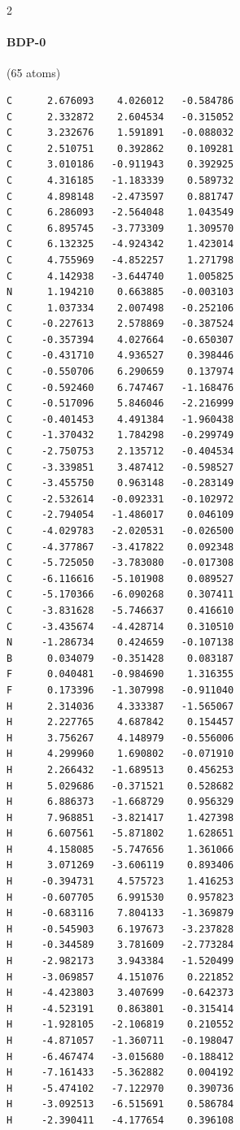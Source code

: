 \begin{multicols}{2}
\paragraph{BDP-0} (65 atoms)
{\scriptsize\linespread{1}\selectfont\begin{verbatim}
C      2.676093    4.026012   -0.584786
C      2.332872    2.604534   -0.315052
C      3.232676    1.591891   -0.088032
C      2.510751    0.392862    0.109281
C      3.010186   -0.911943    0.392925
C      4.316185   -1.183339    0.589732
C      4.898148   -2.473597    0.881747
C      6.286093   -2.564048    1.043549
C      6.895745   -3.773309    1.309570
C      6.132325   -4.924342    1.423014
C      4.755969   -4.852257    1.271798
C      4.142938   -3.644740    1.005825
N      1.194210    0.663885   -0.003103
C      1.037334    2.007498   -0.252106
C     -0.227613    2.578869   -0.387524
C     -0.357394    4.027664   -0.650307
C     -0.431710    4.936527    0.398446
C     -0.550706    6.290659    0.137974
C     -0.592460    6.747467   -1.168476
C     -0.517096    5.846046   -2.216999
C     -0.401453    4.491384   -1.960438
C     -1.370432    1.784298   -0.299749
C     -2.750753    2.135712   -0.404534
C     -3.339851    3.487412   -0.598527
C     -3.455750    0.963148   -0.283149
C     -2.532614   -0.092331   -0.102972
C     -2.794054   -1.486017    0.046109
C     -4.029783   -2.020531   -0.026500
C     -4.377867   -3.417822    0.092348
C     -5.725050   -3.783080   -0.017308
C     -6.116616   -5.101908    0.089527
C     -5.170366   -6.090268    0.307411
C     -3.831628   -5.746637    0.416610
C     -3.435674   -4.428714    0.310510
N     -1.286734    0.424659   -0.107138
B      0.034079   -0.351428    0.083187
F      0.040481   -0.984690    1.316355
F      0.173396   -1.307998   -0.911040
H      2.314036    4.333387   -1.565067
H      2.227765    4.687842    0.154457
H      3.756267    4.148979   -0.556006
H      4.299960    1.690802   -0.071910
H      2.266432   -1.689513    0.456253
H      5.029686   -0.371521    0.528682
H      6.886373   -1.668729    0.956329
H      7.968851   -3.821417    1.427398
H      6.607561   -5.871802    1.628651
H      4.158085   -5.747656    1.361066
H      3.071269   -3.606119    0.893406
H     -0.394731    4.575723    1.416253
H     -0.607705    6.991530    0.957823
H     -0.683116    7.804133   -1.369879
H     -0.545903    6.197673   -3.237828
H     -0.344589    3.781609   -2.773284
H     -2.982173    3.943384   -1.520499
H     -3.069857    4.151076    0.221852
H     -4.423803    3.407699   -0.642373
H     -4.523191    0.863801   -0.315414
H     -1.928105   -2.106819    0.210552
H     -4.871057   -1.360711   -0.198047
H     -6.467474   -3.015680   -0.188412
H     -7.161433   -5.362882    0.004192
H     -5.474102   -7.122970    0.390736
H     -3.092513   -6.515691    0.586784
H     -2.390411   -4.177654    0.396108
\end{verbatim}}

\end{multicols}
